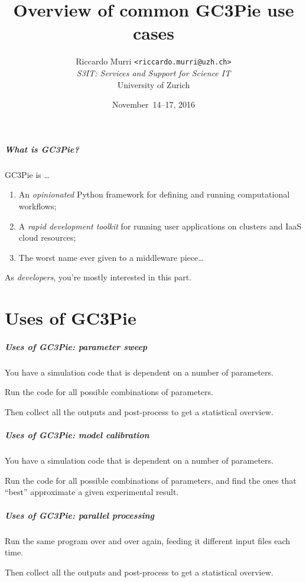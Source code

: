\documentclass[english,serif,mathserif,xcolor=pdftex,dvipsnames,table]{beamer}
\title[Introduction]{%
  Overview of common GC3Pie use cases
}
\author[R. Murri, S3IT UZH]{%
  Riccardo Murri \texttt{<riccardo.murri@uzh.ch>}
  \\[1ex]
  \emph{S3IT: Services and Support for Science IT}
  \\[1ex]
  University of Zurich
}
\date{November~14--17, 2016}
\begin{document}
\maketitle

\begin{frame}
  \frametitle{What is GC3Pie?}
  GC3Pie is \ldots
  \begin{enumerate}
  \item \alert<1>{An \emph{opinionated} Python framework for defining and running computational workflows;}
  \item A \emph{rapid development toolkit} for running user applications on clusters and IaaS cloud resources;
  \item The worst name ever given to a middleware piece\ldots
  \end{enumerate}

  \+
  As \emph{developers}, \alert<1>{you're mostly interested in this part.}
\end{frame}


\part{Uses of GC3Pie}

\begin{frame}[fragile]
  \frametitle{Uses of GC3Pie: parameter sweep}

  You have a simulation code that is dependent on a number of parameters.

  \+
  Run the code for all possible combinations of parameters.

  \+
  Then collect all the outputs and post-process to get a
  statistical overview.
\end{frame}


\begin{frame}[fragile]
  \frametitle{Uses of GC3Pie: model calibration}

  You have a simulation code that is dependent on a number of parameters.

  \+
  Run the code for all possible combinations of parameters, and
  find the ones that ``best'' approximate a given experimental result.
\end{frame}


\begin{frame}[fragile]
  \frametitle{Uses of GC3Pie: parallel processing}

  Run the same program over and over again,
  feeding it different input files each time.

  \+
  Then collect all the outputs and post-process to get a
  statistical overview.
\end{frame}
\end{document}
